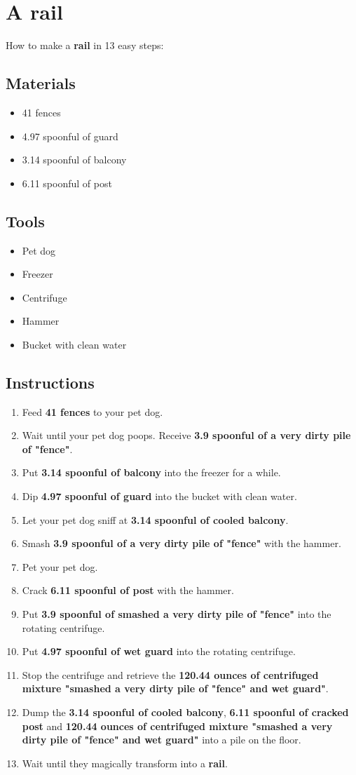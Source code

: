 \documentclass{article}
\begin{document}
\section{A rail}How to make a \textbf{rail} in 13 easy steps:

\subsection{Materials}\begin{itemize}
\item 
41 fences
\item 
4.97 spoonful of guard
\item 
3.14 spoonful of balcony
\item 
6.11 spoonful of post
\end{itemize}
\subsection{Tools}\begin{itemize}
\item 
Pet dog
\item 
Freezer
\item 
Centrifuge
\item 
Hammer
\item 
Bucket with clean water
\end{itemize}
\subsection{Instructions}\begin{enumerate}
\item 
Feed \textbf{41 fences} to your pet dog.
\item 
Wait until your pet dog poops. Receive \textbf{3.9 spoonful of a very dirty pile of "fence"}.
\item 
Put \textbf{3.14 spoonful of balcony} into the freezer for a while.
\item 
Dip \textbf{4.97 spoonful of guard} into the bucket with clean water.
\item 
Let your pet dog sniff at \textbf{3.14 spoonful of cooled balcony}.
\item 
Smash \textbf{3.9 spoonful of a very dirty pile of "fence"} with the hammer.
\item 
Pet your pet dog.
\item 
Crack \textbf{6.11 spoonful of post} with the hammer.
\item 
Put \textbf{3.9 spoonful of smashed a very dirty pile of "fence"} into the rotating centrifuge.
\item 
Put \textbf{4.97 spoonful of wet guard} into the rotating centrifuge.
\item 
Stop the centrifuge and retrieve the \textbf{120.44 ounces of centrifuged mixture "smashed a very dirty pile of "fence" and wet guard"}.
\item 
Dump the \textbf{3.14 spoonful of cooled balcony}, \textbf{6.11 spoonful of cracked post} and \textbf{120.44 ounces of centrifuged mixture "smashed a very dirty pile of "fence" and wet guard"} into a pile on the floor.
\item 
Wait until they magically transform into a \textbf{rail}.
\end{enumerate}
\newpage
\end{document}
